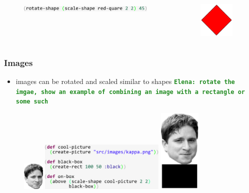 \documentclass{beamer}
\newcommand{\comment}[1]{{\bf \tt  {#1}}}
\newcommand{\emcomment}[1]{\textcolor{ForestGreen}{\comment{Elena: {#1}}}}
\begin{document}
\begin{frame}[fragile]
\begin{itemize}
		\begin{columns}[t]
		\begin{column}{.45\textwidth}
			\begin{figure}[h]
			\vspace{-0.5cm}
			\includegraphics[width=6.5cm]{PresentationImages/rotateAndScaleRedCode.pdf}
			\end{figure}
		\end{column}
		\begin{column}{.3\textwidth}
			\begin{figure}[h]
			\includegraphics[width=1.7cm]{PresentationImages/red-rectangle-scale-rotate.png}
			\end{figure}		
		\end{column}
		\end{columns}
	\end{itemize}
\end{frame}

\begin{frame}
\frametitle{Images}
	\begin{itemize}
		\item images can be rotated and scaled similar to shapes \emcomment{rotate the imgae, show an example of combining an image with a rectangle or some such}
	\end{itemize}
	\begin{figure}
		\vspace{-1.5cm}
		\includegraphics[width=1cm]{PresentationImages/kappa96x130.png}
		\hspace{0.4cm}
		\includegraphics[width=6cm]{PresentationImages/pictureOnBoxCode.pdf}
		\hspace{0.4cm}
		\includegraphics[width=2cm]{PresentationImages/onBoxKappa.pdf}
	\end{figure}
\end{frame}
\end{document}
